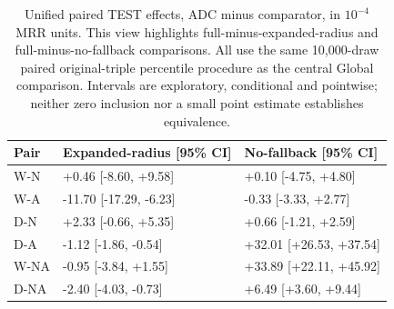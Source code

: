 \begin{table}[htbp]
\centering\footnotesize\setlength{\tabcolsep}{3pt}
\caption{Unified paired TEST effects, ADC minus comparator, in $10^{-4}$ MRR units. This view highlights full-minus-expanded-radius and full-minus-no-fallback comparisons. All use the same 10,000-draw paired original-triple percentile procedure as the central Global comparison. Intervals are exploratory, conditional and pointwise; neither zero inclusion nor a small point estimate establishes equivalence.}
\label{tab:query-components}
\begin{tabular}{lll}
\toprule
Pair & Expanded-radius [95\% CI] & No-fallback [95\% CI]\\
\midrule
W-N & +0.46 [-8.60, +9.58] & +0.10 [-4.75, +4.80]\\
W-A & -11.70 [-17.29, -6.23] & -0.33 [-3.33, +2.77]\\
D-N & +2.33 [-0.66, +5.35] & +0.66 [-1.21, +2.59]\\
D-A & -1.12 [-1.86, -0.54] & +32.01 [+26.53, +37.54]\\
W-NA & -0.95 [-3.84, +1.55] & +33.89 [+22.11, +45.92]\\
D-NA & -2.40 [-4.03, -0.73] & +6.49 [+3.60, +9.44]\\
\bottomrule
\end{tabular}
\end{table}
